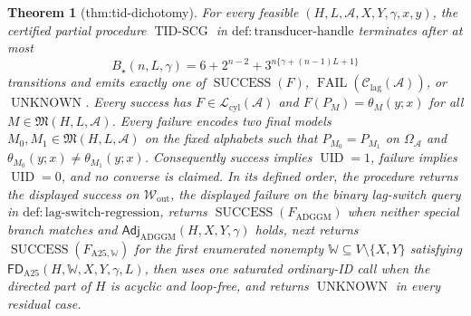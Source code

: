 \documentclass{article}
\newtheorem{theorem}{Theorem}
\begin{document}
\begin{theorem}[thm:tid-dichotomy]\label{thm:tid-dichotomy}
For every feasible \((H,L,\mathcal A,X,Y,\gamma,x,y)\), the certified partial procedure \(\operatorname{TID\text{-}SCG}\) in \(\mathrm{def:transducer\text{-}handle}\) terminates after at most
\[
 B_\star(n,L,\gamma)=6+2^{n-2}+3^{n\{\gamma+(n-1)L+1\}}
\]
transitions and emits exactly one of \(\operatorname{SUCCESS}(F)\), \(\operatorname{FAIL}(\mathcal C_{\mathrm{lag}}(\mathcal A))\), or \(\operatorname{UNKNOWN}\).  Every success has \(F\in\mathcal L_{\mathrm{cyl}}(\mathcal A)\) and \(F(P_M)=\theta_M(y;x)\) for all \(M\in\mathfrak M(H,L,\mathcal A)\).  Every failure encodes two final models \(M_0,M_1\in\mathfrak M(H,L,\mathcal A)\) on the fixed alphabets such that \(P_{M_0}=P_{M_1}\) on \(\Omega_{\mathcal A}\) and \(\theta_{M_0}(y;x)\ne\theta_{M_1}(y;x)\).  Consequently success implies \(\operatorname{UID}=1\), failure implies \(\operatorname{UID}=0\), and no converse is claimed.  In its defined order, the procedure returns the displayed success on \(\mathcal W_{\mathrm{out}}\), the displayed failure on the binary lag-switch query in \(\mathrm{def:lag\text{-}switch\text{-}regression}\), returns \(\operatorname{SUCCESS}(F_{\mathrm{ADGGM}})\) when neither special branch matches and \(\mathsf{Adj}_{\mathrm{ADGGM}}(H,X,Y,\gamma)\) holds, next returns \(\operatorname{SUCCESS}(F_{\mathrm{A25},\mathbb W})\) for the first enumerated nonempty \(\mathbb W\subseteq V\setminus\{X,Y\}\) satisfying \(\mathsf{FD}_{\mathrm{A25}}(H,\mathbb W,X,Y,\gamma,L)\), then uses one saturated ordinary-ID call when the directed part of \(H\) is acyclic and loop-free, and returns \(\operatorname{UNKNOWN}\) in every residual case.
\end{theorem}
\end{document}
